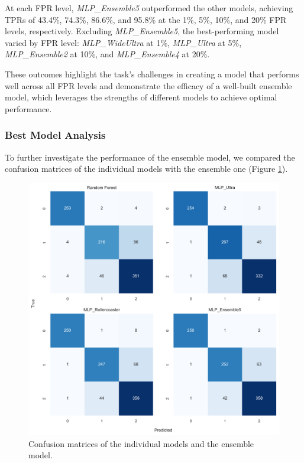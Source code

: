 At each FPR level, \textit{MLP\_Ensemble5} outperformed the other models, 
achieving TPRs of 43.4\%, 74.3\%, 86.6\%, and 95.8\% at the 1\%, 5\%, 10\%, and 20\% FPR levels, 
respectively. Excluding \textit{MLP\_Ensemble5}, the best-performing model varied by 
FPR level: \textit{MLP\_WideUltra} at 1\%, \textit{MLP\_Ultra} at 5\%, \textit{MLP\_Ensemble2} at 10\%, 
and \textit{MLP\_Ensemble4} at 20\%.

These outcomes highlight the task's challenges in creating a model that performs well across all FPR 
levels and demonstrate the efficacy of a well-built ensemble model, which leverages the strengths of 
different models to achieve optimal performance.

\subsubsection{Best Model Analysis}

To further investigate the performance of the ensemble model, we compared the confusion matrices of
the individual models with the ensemble one (Figure \ref{fig:confmat_ensemble_vs_individual}).

\begin{figure}[H]
    \centering
    \includegraphics[width=1\columnwidth]{./images/confmat_ensemble_vs_individual.png}
    \caption{Confusion matrices of the individual models and the ensemble model.}
    \label{fig:confmat_ensemble_vs_individual}
\end{figure}

